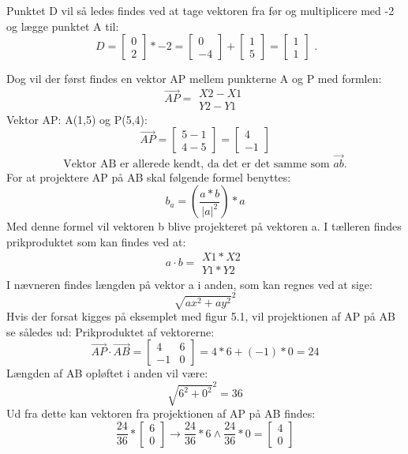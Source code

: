Punktet D vil så ledes findes  ved at tage vektoren fra før og multiplicere med -2 og lægge punktet A til:
\[\ D = \begin{bmatrix} 0 \\ 2 \end{bmatrix} * -2 = \begin{bmatrix} 0 \\ -4 \end{bmatrix} + \begin{bmatrix} 1 \\ 5 \end{bmatrix} = \begin{bmatrix} 1 \\ 1 \end{bmatrix} \text{ .} \]



Dog vil der først findes en vektor AP mellem punkterne A og P med formlen: \[ \overrightarrow{AP} = \begin{matrix}X2-X1 \\ Y2-Y1\end{matrix} \]
Vektor AP: A(1,5) og P(5,4): \[ \overrightarrow{AP} = \begin{bmatrix}5-1 \\ 4-5\end{bmatrix} = \begin{bmatrix} 4 \\ -1 \end{bmatrix} \]
\[ \text{Vektor AB er allerede kendt, da det er det samme som } \overrightarrow{ab} \text{.} \]
For at projektere AP på AB skal følgende formel benyttes: \[ b_{a} = (\frac{a*b}{|a|^2}) * a \]
Med denne formel vil vektoren b blive projekteret på vektoren a. I tælleren findes prikproduktet som kan findes ved at: \[ a \cdot b = \begin{matrix}X1 * X2 \\ Y1 * Y2\end{matrix}  \]
I nævneren findes længden på vektor a i anden, som kan regnes ved at sige: \[ \sqrt{ax^2+ay^2}^2 \]
Hvis der forsat kigges på eksemplet med figur 5.1, vil projektionen af AP på AB se således ud:
Prikproduktet af vektorerne: \[ \overrightarrow{AP} \cdot \overrightarrow{AB} = \begin{bmatrix} 4 & 6 \\ -1 & 0 \end{bmatrix} = 4*6+(-1)*0 = 24 \]
Længden af AB opløftet i anden vil være: \[ \sqrt{6^2+0^2}^2 = 36 \]
Ud fra dette kan vektoren fra projektionen af AP på AB findes: 
\[ \frac{24}{36} * \begin{bmatrix} 6 \\ 0 \end{bmatrix} \rightarrow \frac{24}{36} * 6 \wedge \frac{24}{36} * 0 = \begin{bmatrix} 4 \\ 0 \end{bmatrix} \]

